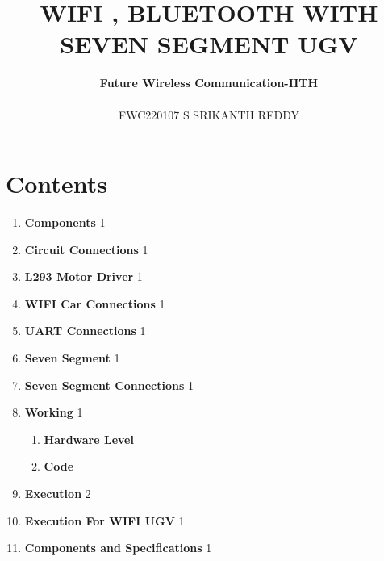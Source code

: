 \documentclass[journal,15pt,twocolumn,tikz, border=5mm]{IEEEtran}
\begin{document}
\title{ WIFI , BLUETOOTH WITH SEVEN SEGMENT UGV }
\def\myauthor{\textbf{Future Wireless Communication-IITH}}
\def\mymodule{S SRIKANTH REDDY}
\author{\myauthor\hspace{1em}\\\contact\\FWC220107 \hspace{6.5em}\hspace{0.5em}\mymodule\hspace{6em}}
\maketitle
\newpage
\bigskip
\renewcommand{\thefigure}{\theenumi}
\renewcommand{\thetable}{\theenumi}
\raggedright

%

\section*{Contents}
\begin{enumerate}
\item \textbf{Components} \hspace{4.1cm} 1\\
\item \textbf{Circuit Connections} \hspace{2.9cm} 1\\
\item \textbf{L293 Motor Driver} \hspace{3.0cm} 1\\
\item \textbf{WIFI Car Connections }\hspace{2.4cm} 1\\
\item \textbf{UART Connections }\hspace{3.0cm} 1\\
\item \textbf{Seven Segment}\hspace{3.8cm} 1\\
\item \textbf{Seven Segment Connections}\hspace{1.8cm} 1\\
\item \textbf{Working}\hspace{4.8cm} 1 \\
	\begin{enumerate}
	\item \textbf{Hardware Level}
	\item \textbf{Code}
	\end{enumerate}
\item \textbf{Execution} \hspace{4.45cm} 2 \\
\item \textbf{Execution For WIFI UGV} \hspace{1.9cm} 1 \\
\item \textbf{Components and Specifications} \hspace{1.2cm} 1 \\
\end{enumerate}
\end{document}
